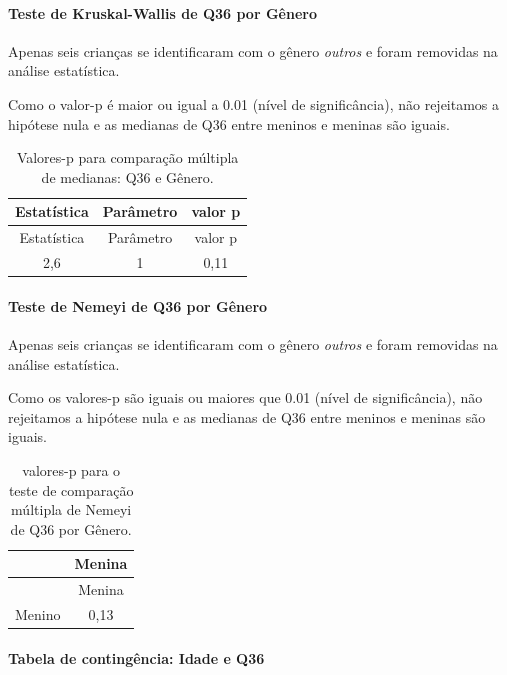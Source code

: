 \documentclass[]{article}
\let\oldparagraph\paragraph
\renewcommand{\paragraph}[1]{\oldparagraph{#1}\mbox{}}
\begin{document}
\hypertarget{teste-de-kruskal-wallis-de-q36-por-guxeanero}{%
\paragraph{Teste de Kruskal-Wallis de Q36 por Gênero}\label{teste-de-kruskal-wallis-de-q36-por-guxeanero}}

Apenas seis crianças se identificaram com o gênero \emph{outros} e foram removidas na análise estatística.

Como o valor-p é maior ou igual a 0.01 (nível de significância), não rejeitamos a hipótese nula e as medianas de Q36 entre meninos e meninas são iguais.

\begin{longtable}[]{@{}ccc@{}}
\caption{\label{tab:unnamed-chunk-1327}Valores-p para comparação múltipla de medianas: Q36 e Gênero.}\tabularnewline
\toprule
Estatística & Parâmetro & valor p\tabularnewline
\midrule
\endfirsthead
\toprule
Estatística & Parâmetro & valor p\tabularnewline
\midrule
\endhead
2,6 & 1 & 0,11\tabularnewline
\bottomrule
\end{longtable}

\hypertarget{teste-de-nemeyi-de-q36-por-guxeanero}{%
\paragraph{Teste de Nemeyi de Q36 por Gênero}\label{teste-de-nemeyi-de-q36-por-guxeanero}}

Apenas seis crianças se identificaram com o gênero \emph{outros} e foram removidas na análise estatística.

Como os valores-p são iguais ou maiores que 0.01 (nível de significância), não rejeitamos a hipótese nula e as medianas de Q36 entre meninos e meninas são iguais.

\begin{longtable}[]{@{}lc@{}}
\caption{\label{tab:unnamed-chunk-1329}valores-p para o teste de comparação múltipla de Nemeyi de Q36 por Gênero.}\tabularnewline
\toprule
& Menina\tabularnewline
\midrule
\endfirsthead
\toprule
& Menina\tabularnewline
\midrule
\endhead
Menino & 0,13\tabularnewline
\bottomrule
\end{longtable}

\cleardoublepage

\hypertarget{tabela-de-continguxeancia-idade-e-q36}{%
\paragraph{Tabela de contingência: Idade e Q36}\label{tabela-de-continguxeancia-idade-e-q36}}
\end{document}
